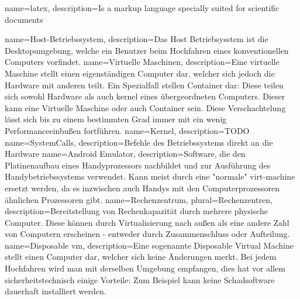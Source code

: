 {
    name=latex,
    description={Is a markup language specially suited 
    for scientific documents}
}



{
    name={Host-Betriebssystem},
    description={Das Host Betriebsysstem ist die Desktopumgebung, welche ein Benutzer beim Hochfahren eines konventionellen Computers vorfindet.}
}
{
    name={Virtuelle Maschinen},
    description={Eine virtuelle Maschine stellt einen eigenständigen Computer dar, welcher sich jedoch die Hardware mit anderen teilt. Ein Spezialfall stellen Container dar: Diese teilen sich sowohl Hardware als auch \gls{kernel} eines übergeordneten Computers. Dieser kann eine Virtuelle Maschine oder auch Container sein. Diese Verschachtelung lässt sich bis zu einem bestimmten Grad immer mit ein wenig Performanceeinbußen fortführen.}
}
{
    name={Kernel},
    description={TODO}
}
{
    name={SystemCalls},
    description={Befehle des Betriebssystems direkt an die Hardware}
}
{
    name={Android Emulator},
    description={Software, die den Platinenaufbau eines Handyprozessors nachbildet und zur Ausführung des Handybetriebssystems verwendet. Kann meist durch eine "normale" \gls{virt-machine} ersetzt werden, da es inzwischen auch Handys mit den Computerprozessoren ähnlichen Prozessoren gibt.}
}
{
    name={Rechenzentrum},
    plural={Rechenzentren},
    description={Bereitstellung von Rechenkapazität durch mehrere physische Computer. Diese können durch Virtualisierung nach außen als eine andere Zahl von Computern erscheinen - entweder durch Zusammenschluss oder Aufteilung.}
}
{
    name={Disposable \gls{vm}},
    description={Eine sogenannte Disposable Virtual Machine stellt einen Computer dar, welcher sich keine Änderungen merkt. Bei jedem Hochfahren wird man mit derselben Umgebung empfangen, dies hat vor allem sicherheitstechnisch einige Vorteile: Zum Beispiel kann keine Schadsoftware dauerhaft installiert werden.}
}

